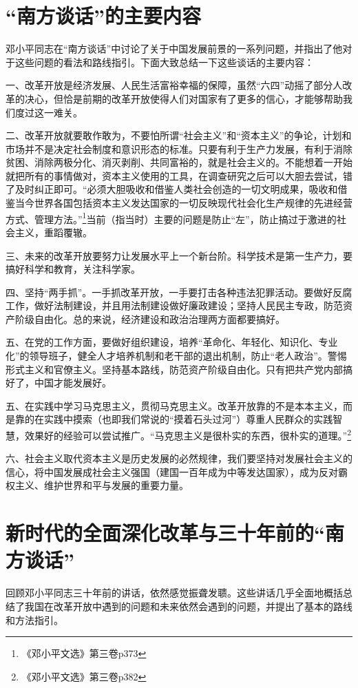 \documentclass[12pt]{article}
\begin{document}
\section{“南方谈话”的主要内容}
邓小平同志在“南方谈话”中讨论了关于中国发展前景的一系列问题，并指出了他对于这些问题的看法和路线指引。下面大致总结一下这些谈话的主要内容：

一、改革开放是经济发展、人民生活富裕幸福的保障，虽然“六四”动摇了部分人改革的决心，但恰是前期的改革开放使得人们对国家有了更多的信心，才能够帮助我们度过这一难关。

二、改革开放就要敢作敢为，不要怕所谓“社会主义”和“资本主义”的争论，计划和市场并不是决定社会制度和意识形态的标准。只要有利于生产力发展，有利于消除贫困、消除两极分化、消灭剥削、共同富裕的，就是社会主义的。不能想着一开始就把所有的事情做对，资本主义使用的工具，在调查研究之后可以大胆去尝试，错了及时纠正即可。“必须大胆吸收和借鉴人类社会创造的一切文明成果，吸收和借鉴当今世界各国包括资本主义发达国家的一切反映现代社会化生产规律的先进经营方式、管理方法。”\footnote{《邓小平文选》第三卷p373}当前（指当时）主要的问题是防止“左”，防止搞过于激进的社会主义，重蹈覆辙。

三、未来的改革开放要努力让发展水平上一个新台阶。科学技术是第一生产力，要搞好科学和教育，关注科学家。

四、坚持“两手抓”。一手抓改革开放，一手要打击各种违法犯罪活动。要做好反腐工作，做好法制建设，并且用法制建设做好廉政建设；坚持人民民主专政，防范资产阶级自由化。总的来说，经济建设和政治治理两方面都要搞好。

五、在党的工作方面，要做好组织建设，培养“革命化、年轻化、知识化、专业化”的领导班子，健全人才培养机制和老干部的退出机制，防止“老人政治”。警惕形式主义和官僚主义。坚持基本路线，防范资产阶级自由化。只有把共产党内部搞好了，中国才能发展好。

五、在实践中学习马克思主义，贯彻马克思主义。改革开放靠的不是本本主义，而是靠的在实践中摸索（也即我们常说的“摸着石头过河”）尊重人民群众的实践智慧，效果好的经验可以尝试推广。“马克思主义是很朴实的东西，很朴实的道理。”\footnote{《邓小平文选》第三卷p382}

六、社会主义取代资本主义是历史发展的必然规律，我们要坚持对发展社会主义的信心，将中国发展成社会主义强国（建国一百年成为中等发达国家），成为反对霸权主义、维护世界和平与发展的重要力量。

\section{新时代的全面深化改革与三十年前的“南方谈话”}
回顾邓小平同志三十年前的讲话，依然感觉振聋发聩。这些讲话几乎全面地概括总结了我国在改革开放中遇到的问题和未来依然会遇到的问题，并提出了基本的路线和方法指引。
\end{document}

